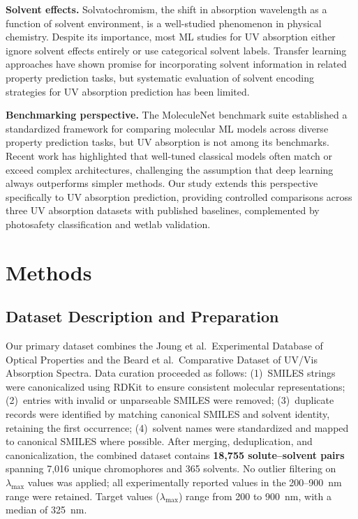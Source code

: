 \textbf{Solvent effects.}
Solvatochromism, the shift in absorption wavelength as a function of solvent environment, is a well-studied phenomenon in physical chemistry\cite{reichardt2011solvents}.
Despite its importance, most ML studies for UV absorption either ignore solvent effects entirely or use categorical solvent labels.
Transfer learning approaches have shown promise for incorporating solvent information in related property prediction tasks\cite{vermeire2021transfer}, but systematic evaluation of solvent encoding strategies for UV absorption prediction has been limited.

\textbf{Benchmarking perspective.}
The MoleculeNet benchmark suite\cite{wuMoleculeNet2018} established a standardized framework for comparing molecular ML models across diverse property prediction tasks, but UV absorption is not among its benchmarks.
Recent work has highlighted that well-tuned classical models often match or exceed complex architectures\cite{panapitiya2022evaluation, walters2021applications}, challenging the assumption that deep learning always outperforms simpler methods.
Our study extends this perspective specifically to UV absorption prediction, providing controlled comparisons across three UV absorption datasets with published baselines, complemented by photosafety classification and wetlab validation.


\section{Methods}
\label{sec:methods}

\subsection{Dataset Description and Preparation}
\label{sec:dataset}

Our primary dataset combines the Joung et al.\ Experimental Database of Optical Properties\cite{joung2020experimental} and the Beard et al.\ Comparative Dataset of UV/Vis Absorption Spectra\cite{beard2019comparative}.
Data curation proceeded as follows: (1)~SMILES strings were canonicalized using RDKit\cite{landrumRdkitRdkit2020_03_12020} to ensure consistent molecular representations; (2)~entries with invalid or unparseable SMILES were removed; (3)~duplicate records were identified by matching canonical SMILES and solvent identity, retaining the first occurrence; (4)~solvent names were standardized and mapped to canonical SMILES where possible.
After merging, deduplication, and canonicalization, the combined dataset contains \textbf{18,755 solute--solvent pairs} spanning 7,016 unique chromophores and 365 solvents.
No outlier filtering on $\lambda_{\max}$ values was applied; all experimentally reported values in the 200--900~nm range were retained.
Target values ($\lambda_{\max}$) range from 200 to 900~nm, with a median of 325~nm.

